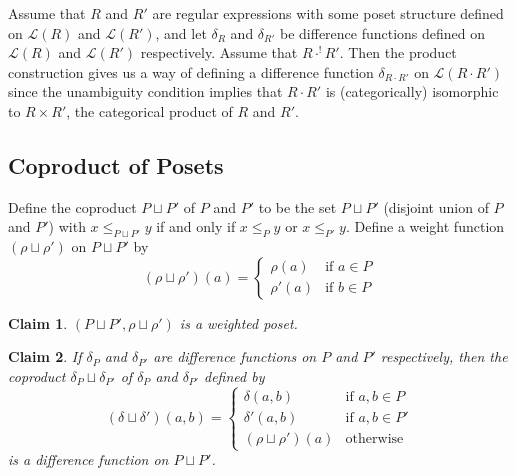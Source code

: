 \documentclass[acmsmall,review,anonymous]{acmart}\settopmatter{printfolios=true,printccs=false,printacmref=false}
\newtheorem{claim}{Claim}
\begin{document}
Assume that $R$ and $R'$ are regular expressions with some poset structure
defined on $\mathcal{L}(R)$ and $\mathcal{L}(R')$, and let $\delta_R$ and
$\delta_{R'}$ be difference functions defined on $\mathcal{L}(R)$ and
$\mathcal{L}(R')$ respectively. Assume that $R \cdot^! R'$. Then the product
construction gives us a way of defining a difference function $\delta_{R \cdot
R'}$ on $\mathcal{L}(R \cdot R')$ since the unambiguity condition implies that
$R \cdot R'$ is (categorically) isomorphic to $R \times R'$, the categorical
product of $R$ and $R'$.

\subsection{Coproduct of Posets}
Define the coproduct $P \sqcup P'$ of $P$ and $P'$ to be the set $P \sqcup P'$
(disjoint union of $P$ and $P'$) with $x \leq_{P \sqcup P'} y$ if and only if
$x \leq_P y$ or $x \leq_{P'} y$. Define a weight function
$(\rho \sqcup \rho')$ on $P \sqcup P'$ by
$$(\rho \sqcup \rho')(a) =
\begin{cases}
\rho(a) &\text{if }a \in P\\
\rho'(a) &\text{if }b \in P
\end{cases}$$
\begin{claim}
$(P \sqcup P', \rho \sqcup \rho')$ is a weighted poset.
\end{claim}
\begin{claim}
If $\delta_P$ and $\delta_{P'}$ are difference
functions on $P$ and $P'$ respectively, then the coproduct $\delta_P \sqcup
\delta_{P'}$ of $\delta_P$ and $\delta_{P'}$ defined by $$(\delta \sqcup
\delta')(a, b) =
\begin{cases}
\delta(a, b) &\text{if }a, b \in P\\
\delta'(a, b) &\text{if }a, b \in P'\\
(\rho \sqcup \rho')(a) & \text{otherwise}
\end{cases}$$
is a difference function on $P \sqcup P'$.
\end{claim}
\end{document}
